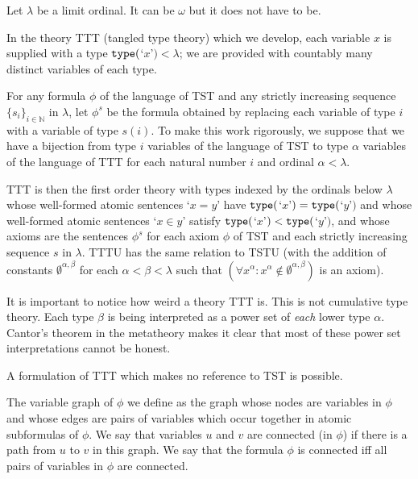 \documentclass{article}
\newif\ifshowannotations
\newcommand{\annot}[1]{\ifshowannotations\marginpar{#1}\fi}
\newcommand{\abf}{\ifshowannotations\bf\fi}
\theoremstyle{definition}
\theoremstyle{remark}
\begin{document}
{Let $\lambda$ be a limit ordinal.  It can be $\omega$ but it does not have to be.

In the theory TTT (tangled type theory) which we develop, each variable $x$ is supplied with a type ${\tt type}($`$x$'$) <\lambda$;  we are provided with countably many distinct variables of each type.

For any formula $\phi$ of the language of TST and any strictly increasing sequence $\{s_i\}_{i \in \mathbb N}$ in $\lambda$, let $\phi^s$ be the formula obtained by replacing each variable
of type $i$ with a variable of type $s(i)$.  To make this work rigorously, we suppose that we have a bijection from type $i$ variables of the language of TST to type $\alpha$ variables
of the language of TTT for each natural number $i$ and ordinal $\alpha<\lambda$.



TTT is then the first order theory with types indexed by the ordinals below $\lambda$ whose well-formed atomic sentences `$x=y$' have ${\tt type}($`$x$'$) = {\tt type}($`$y$'$)$ and whose well-formed atomic sentences `$x \in y$' satisfy ${\tt type}($`$x$'$) < {\tt type}($`$y$'$)$, and whose axioms are the sentences $\phi^s$ for each axiom $\phi$ of TST and each strictly increasing sequence $s$ in $\lambda$.  TTTU has the same relation to TSTU (with the addition of constants $\emptyset^{\alpha,\beta}$ for each $\alpha<\beta<\lambda$  such that $(\forall x^{\alpha} :x^{\alpha}\not\in \emptyset^{\alpha,\beta})$ is an axiom).

It is important to notice how weird a theory TTT is.  This is not cumulative type theory.  Each type $\beta$ is being interpreted as a power set of {\em each\/} lower type $\alpha$.  Cantor's theorem in the metatheory makes it clear that most of these power set interpretations cannot be honest.

{\abf A formulation of TTT which makes no reference to TST is possible.

The variable graph of $\phi$ we define as the graph whose nodes are variables in $\phi$ and whose edges are pairs of variables which occur together in atomic subformulas of $\phi$.  We say that variables $u$ and $v$ are connected (in $\phi$) if there is a path from $u$ to $v$ in this graph.   We say that the formula $\phi$ is connected iff all pairs of variables in $\phi$ are connected.  \annot{We would like to add the bold-face language here to give a presentation of TTT which doesn't depend on TST, but the referee may weigh in on whether this is useful.  It doesn't affect anything that follows.}

}}
\end{document}
